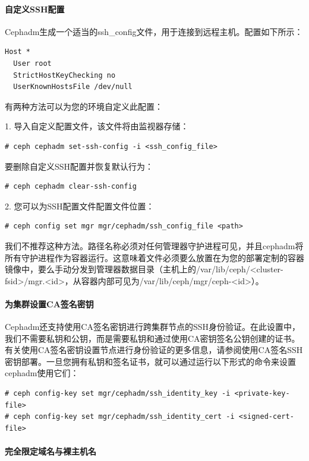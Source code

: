 \documentclass[12pt,UTF8]{ctexbook}
\begin{document}
\paragraph{自定义SSH配置}

Cephadm生成一个适当的ssh_config文件，用于连接到远程主机。配置如下所示：
\begin{verbatim}
Host *
  User root
  StrictHostKeyChecking no
  UserKnownHostsFile /dev/null
\end{verbatim}

有两种方法可以为您的环境自定义此配置：

1. 导入自定义配置文件，该文件将由监视器存储：
\begin{verbatim}
# ceph cephadm set-ssh-config -i <ssh_config_file>
\end{verbatim}

要删除自定义SSH配置并恢复默认行为：
\begin{verbatim}
# ceph cephadm clear-ssh-config
\end{verbatim}

2. 您可以为SSH配置文件配置文件位置：
\begin{verbatim}
# ceph config set mgr mgr/cephadm/ssh_config_file <path>
\end{verbatim}

我们不推荐这种方法。路径名称必须对任何管理器守护进程可见，并且cephadm将所有守护进程作为容器运行。这意味着文件必须要么放置在为您的部署定制的容器镜像中，要么手动分发到管理器数据目录（主机上的/var/lib/ceph/<cluster-fsid>/mgr.<id>，从容器内部可见为/var/lib/ceph/mgr/ceph-<id>）。

\paragraph{为集群设置CA签名密钥}

Cephadm还支持使用CA签名密钥进行跨集群节点的SSH身份验证。在此设置中，我们不需要私钥和公钥，而是需要私钥和通过使用CA密钥签名公钥创建的证书。有关使用CA签名密钥设置节点进行身份验证的更多信息，请参阅使用CA签名SSH密钥部署。一旦您拥有私钥和签名证书，就可以通过运行以下形式的命令来设置cephadm使用它们：
\begin{verbatim}
# ceph config-key set mgr/cephadm/ssh_identity_key -i <private-key-file>
# ceph config-key set mgr/cephadm/ssh_identity_cert -i <signed-cert-file>
\end{verbatim}

\paragraph{完全限定域名与裸主机名}
\end{document}

